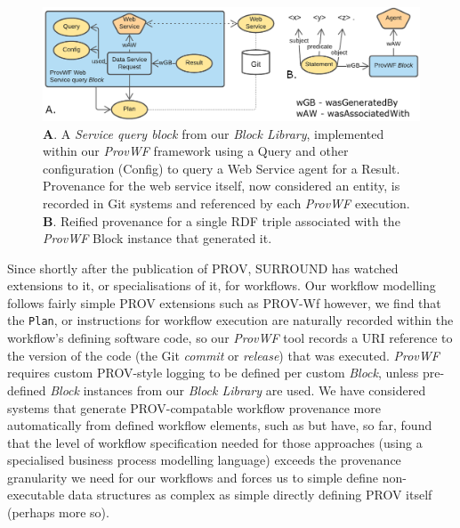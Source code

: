 \documentclass[letterpaper,twocolumn,10pt]{article}
\begin{document}
\begin{figure}
  \begin{center}
    \includegraphics[width=\textwidth]{images/ds-reified.png}
  \end{center}
  \caption{\label{fig:reified-graph-data} \textbf{A}. A \textit{Service query block} from our \textit{Block Library}, implemented within our \textit{ProvWF} framework using a Query and other configuration (Config) to query a Web Service agent for a Result. Provenance for the web service itself, now considered an entity, is recorded in Git systems and referenced by each \textit{ProvWF} execution. \textbf{B}. Reified provenance for a single RDF triple associated with the \textit{ProvWF} Block instance that generated it.}
\end{figure}

Since shortly after the publication of PROV, SURROUND has watched extensions to it, or specialisations of it, for workflows. Our workflow modelling 
follows fairly simple PROV extensions such as PROV-Wf \cite{costa_2013} however, we find that the \texttt{Plan},
or instructions for workflow execution are naturally recorded within the workflow's defining software
code, so our \textit{ProvWF} tool records a URI reference to the version of the code (the Git \textit{commit} or \textit{release}) that was executed.
\textit{ProvWF} requires custom PROV-style logging to be defined per custom \textit{Block}, unless pre-defined \textit{Block} instances from our 
\textit{Block Library} are used. We have considered systems that generate PROV-compatable workflow provenance more automatically from defined 
workflow elements, such as \cite{prabhune_prov2one_2016} but have, so far, found that the level of workflow specification needed for those approaches 
(using a specialised business process modelling language) exceeds the provenance granularity we need for our workflows and forces us to simple define 
non-executable data structures as complex as simple directly defining PROV itself (perhaps more so).
\end{document}
